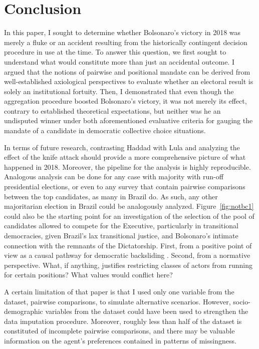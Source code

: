 \documentclass[hidelinks,11pt]{article} \usepackage[utf8]{inputenc}
\begin{document}
\section{Conclusion}

In this paper, I sought to determine whether Bolsonaro's victory in 2018 was
merely a fluke or an accident resulting from the historically contingent
decision procedure in use at the time. To answer this question, we first sought
to understand what would constitute more than just an accidental outcome. I
argued that the notions of pairwise and positional mandate can be derived from
well-established axiological perspectives to evaluate whether an electoral
result is solely an institutional fortuity. Then, I demonstrated that even
though the aggregation procedure boosted Bolsonaro's victory, it was not merely
its effect, contrary to established theoretical expectations, but neither was he
an undisputed winner under both aforementioned evaluative criteria for gauging
the mandate of a candidate in democratic collective choice situations.

In terms of future research, contrasting Haddad with Lula and analyzing the
effect of the knife attack should provide a more comprehensive picture of what
happened in 2018. Moreover, the pipeline for the analysis is highly
reproducible. Analogous analysis can be done for any case with majority with
run-off presidential elections, or even to any survey that contain pairwise
comparisons between the top candidates, as many in Brazil do. As such, any other
majoritarian election in Brazil could be analogously analyzed. Figure~\ref{fig:notbc1} could
also be the starting point for an investigation of the selection of the pool of
candidates allowed to compete for the Executive, particularly in transitional
democracies, given Brazil's lax transitional justice, and Bolsonaro's intimate
connection with the remnants of the Dictatorship. First, from a positive point
of view as a causal pathway for democratic backsliding
\parencite{svolik2008authoritarian, nalepa2022after}. Second, from a normative
perspective. What, if anything, justifies restricting classes of actors from
running for certain positions? What values would conflict here?

A certain limitation of that paper is that I used only one variable from
the dataset, pairwise comparisons, to simulate alternative scenarios. However,
socio-demographic variables from the dataset could have been used to strengthen
the data imputation procedure. Moreover, roughly less than half of the dataset
is constituted of incomplete pairwise comparisons, and there may be valuable
information on the agent's preferences contained in patterns of missingness.
\end{document}
